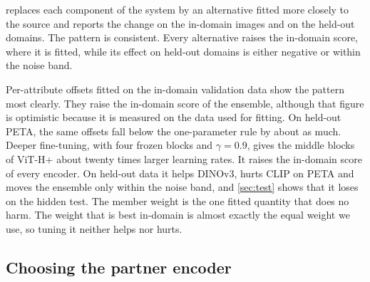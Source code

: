 \documentclass[10pt,twocolumn,letterpaper]{article}
\begin{document}
 replaces each component of the system by an alternative fitted more closely to the source and reports the change on the in-domain images and on the held-out domains. The pattern is consistent. Every alternative raises the in-domain score, where it is fitted, while its effect on held-out domains is either negative or within the noise band.

Per-attribute offsets fitted on the in-domain validation data show the pattern most clearly. They raise the in-domain score of the ensemble, although that figure is optimistic because it is measured on the data used for fitting. On held-out PETA, the same offsets fall below the one-parameter rule by about as much. Deeper fine-tuning, with four frozen blocks and $\gamma=0.9$, gives the middle blocks of ViT-H+ about twenty times larger learning rates. It raises the in-domain score of every encoder. On held-out data it helps DINOv3, hurts CLIP on PETA and moves the ensemble only within the noise band, and \cref{sec:test} shows that it loses on the hidden test. The member weight is the one fitted quantity that does no harm. The weight that is best in-domain is almost exactly the equal weight we use, so tuning it neither helps nor hurts.

\begin{table}[t]
\centering\small
\setlength{\tabcolsep}{3pt}
\caption{Change in Avg when a component is replaced by an alternative fitted more closely to the source domains.}
\label{tab:fitting}
\end{table}

\subsection{Choosing the partner encoder}
\label{sec:pairing}
\end{document}
